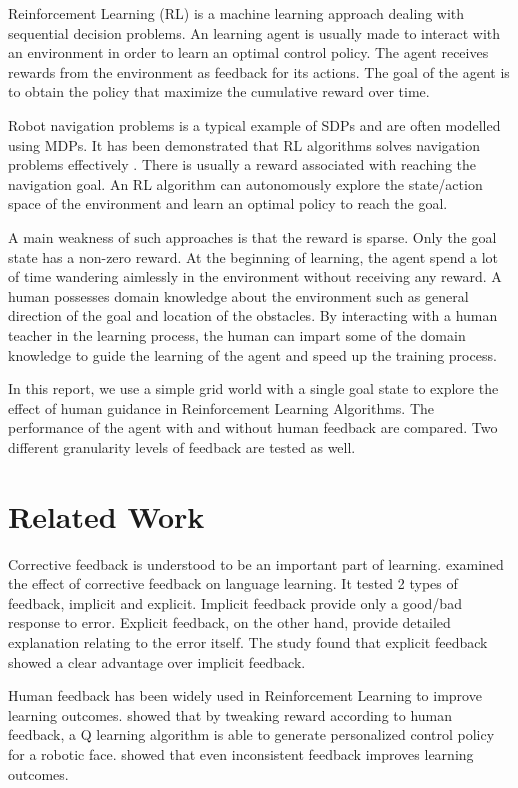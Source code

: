 \documentclass[conference]{IEEEtran}
\begin{document}
Reinforcement Learning (RL) is a machine learning approach dealing with sequential decision problems. An learning agent is usually made to interact with an environment in order to learn an optimal control policy. The agent receives rewards from the environment as feedback for its actions. The goal of the agent is to obtain the policy that maximize the cumulative reward over time.

Robot navigation problems is a typical example of SDPs and are often modelled using MDPs. It has been demonstrated that RL algorithms solves navigation problems effectively \cite{zhuDeepReinforcementLearning2021}. There is usually a reward associated with reaching the navigation goal. An RL algorithm can autonomously explore the state/action space of the environment and learn an optimal policy to reach the goal.

A main weakness of such approaches is that the reward is sparse. Only the goal state has a non-zero reward. At the beginning of learning, the agent spend a lot of time wandering aimlessly in the environment without receiving any reward. A human possesses domain knowledge about the environment such as general direction of the goal and location of the obstacles. By interacting with a human teacher in the learning process, the human can impart some of the domain knowledge to guide the learning of the agent and speed up the training process.

In this report, we use a simple grid world with a single goal state to explore the effect of human guidance in Reinforcement Learning Algorithms. The performance of the agent with and without human feedback are compared. Two different granularity levels of feedback are tested as well.

\section{Related Work}

Corrective feedback is understood to be an important part of learning. \cite{ellisIMPLICITEXPLICITCORRECTIVE2006} examined the effect of corrective feedback on language learning. It tested 2 types of feedback, implicit and explicit. Implicit feedback provide only a good/bad response to error. Explicit feedback, on the other hand, provide detailed explanation relating to the error itself. The study found that explicit feedback showed a clear advantage over implicit feedback.

Human feedback has been widely used in Reinforcement Learning \cite{liHumanCenteredReinforcementLearning2019} to improve learning outcomes. \cite{iidaGeneratingPersonalityCharacter1998} showed that by tweaking reward according to human feedback, a Q learning algorithm is able to generate personalized control policy for a robotic face. \cite{tenorio-gonzalezDynamicRewardShaping2010} showed that even inconsistent feedback improves learning outcomes.
\end{document}
